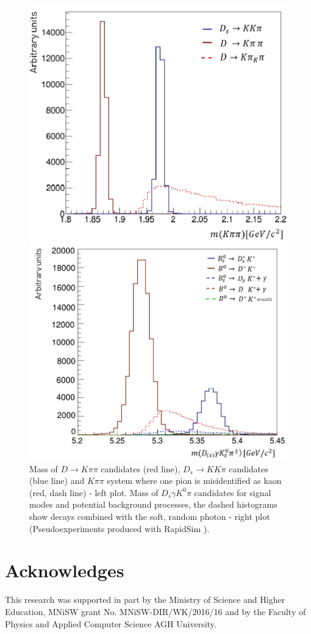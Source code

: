 \documentclass{appolb}
\begin{document}
\begin{figure}[h!]
\begin{minipage}{0.5\textwidth}
  \centering
\includegraphics[width=6.2 cm]{D3.png}
\end{minipage}%
\begin{minipage}{0.5\textwidth}
  \centering
\includegraphics[width= 6.7 cm]{B_new.png}
\end{minipage}%
\caption{Mass of $D \to K \pi \pi$ candidates (red line), $D_s \to K K \pi$ candidates (blue line) and $K\pi\pi$ system where one pion is misidentified as kaon (red, dash line) - left plot.
Mass  of $D_s \gamma K^0 \pi$ candidates for signal modes and potential background processes, the dashed histograms show decays combined with the soft, random photon - right plot (Pseudoexperiments produced with RapidSim \cite{rapidsim}).}
\label{Fig:F3}
\end{figure}

\section{Acknowledges}
This research was supported in part by the Ministry of Science and Higher Education,
MNiSW  grant No. MNiSW-DIR/WK/2016/16 and by the Faculty of Physics and Applied Computer Science AGH University.
\end{document}
